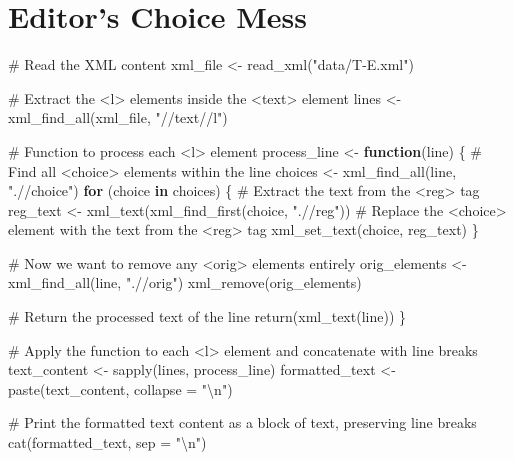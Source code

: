 \documentclass[
  letterpaper,
  DIV=11,
  numbers=noendperiod]{scrreprt}
\newenvironment{Shaded}{\begin{snugshade}}{\end{snugshade}}
\newcommand{\AttributeTok}[1]{\textcolor[rgb]{0.40,0.45,0.13}{#1}}
\newcommand{\CommentTok}[1]{\textcolor[rgb]{0.37,0.37,0.37}{#1}}
\newcommand{\ControlFlowTok}[1]{\textcolor[rgb]{0.00,0.23,0.31}{\textbf{#1}}}
\newcommand{\FunctionTok}[1]{\textcolor[rgb]{0.28,0.35,0.67}{#1}}
\newcommand{\NormalTok}[1]{\textcolor[rgb]{0.00,0.23,0.31}{#1}}
\newcommand{\OtherTok}[1]{\textcolor[rgb]{0.00,0.23,0.31}{#1}}
\newcommand{\SpecialCharTok}[1]{\textcolor[rgb]{0.37,0.37,0.37}{#1}}
\newcommand{\StringTok}[1]{\textcolor[rgb]{0.13,0.47,0.30}{#1}}
\begin{document}
\section{Editor's Choice Mess}

\begin{Shaded}
\begin{Highlighting}[]
\CommentTok{\# Read the XML content}
\NormalTok{xml\_file }\OtherTok{\textless{}{-}} \FunctionTok{read\_xml}\NormalTok{(}\StringTok{"data/T{-}E.xml"}\NormalTok{)}

\CommentTok{\# Extract the \textless{}l\textgreater{} elements inside the \textless{}text\textgreater{} element}
\NormalTok{lines }\OtherTok{\textless{}{-}} \FunctionTok{xml\_find\_all}\NormalTok{(xml\_file, }\StringTok{"//text//l"}\NormalTok{)}

\CommentTok{\# Function to process each \textless{}l\textgreater{} element}
\NormalTok{process\_line }\OtherTok{\textless{}{-}} \ControlFlowTok{function}\NormalTok{(line) \{}
  \CommentTok{\# Find all \textless{}choice\textgreater{} elements within the line}
\NormalTok{  choices }\OtherTok{\textless{}{-}} \FunctionTok{xml\_find\_all}\NormalTok{(line, }\StringTok{".//choice"}\NormalTok{)}
  \ControlFlowTok{for}\NormalTok{ (choice }\ControlFlowTok{in}\NormalTok{ choices) \{}
    \CommentTok{\# Extract the text from the \textless{}reg\textgreater{} tag}
\NormalTok{    reg\_text }\OtherTok{\textless{}{-}} \FunctionTok{xml\_text}\NormalTok{(}\FunctionTok{xml\_find\_first}\NormalTok{(choice, }\StringTok{".//reg"}\NormalTok{))}
    \CommentTok{\# Replace the \textless{}choice\textgreater{} element with the text from the \textless{}reg\textgreater{} tag}
    \FunctionTok{xml\_set\_text}\NormalTok{(choice, reg\_text)}
\NormalTok{  \}}
  
  \CommentTok{\# Now we want to remove any \textless{}orig\textgreater{} elements entirely}
\NormalTok{  orig\_elements }\OtherTok{\textless{}{-}} \FunctionTok{xml\_find\_all}\NormalTok{(line, }\StringTok{".//orig"}\NormalTok{)}
  \FunctionTok{xml\_remove}\NormalTok{(orig\_elements)}
  
  \CommentTok{\# Return the processed text of the line}
  \FunctionTok{return}\NormalTok{(}\FunctionTok{xml\_text}\NormalTok{(line))}
\NormalTok{\}}

\CommentTok{\# Apply the function to each \textless{}l\textgreater{} element and concatenate with line breaks}
\NormalTok{text\_content }\OtherTok{\textless{}{-}} \FunctionTok{sapply}\NormalTok{(lines, process\_line)}
\NormalTok{formatted\_text }\OtherTok{\textless{}{-}} \FunctionTok{paste}\NormalTok{(text\_content, }\AttributeTok{collapse =} \StringTok{"}\SpecialCharTok{\textbackslash{}n}\StringTok{"}\NormalTok{)}

\CommentTok{\# Print the formatted text content as a block of text, preserving line breaks}
\FunctionTok{cat}\NormalTok{(formatted\_text, }\AttributeTok{sep =} \StringTok{"}\SpecialCharTok{\textbackslash{}n}\StringTok{"}\NormalTok{)}
\end{Highlighting}
\end{Shaded}
\end{document}
